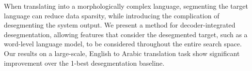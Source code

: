 When translating into a morphologically complex language, segmenting the target language can reduce data sparsity, while introducing the complication of desegmenting the system output. We present a method for decoder-integrated desegmentation, allowing features that consider the desegmented target, such as a word-level language model, to be considered throughout the entire search space. Our results on a large-scale, English to Arabic translation task show significant improvement over the 1-best desegmentation baseline.
